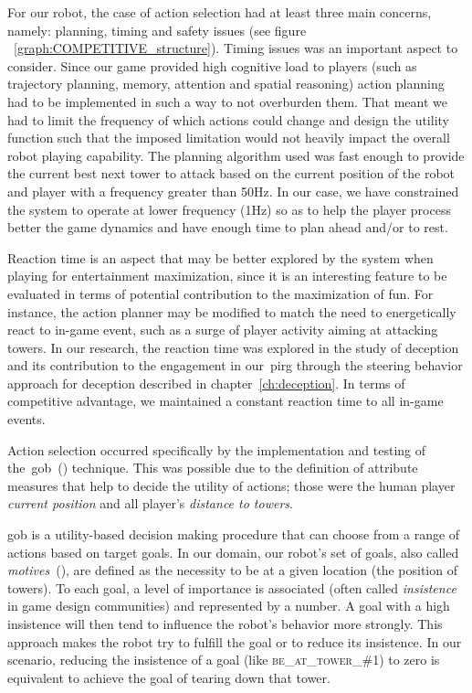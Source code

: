 For our robot, the case of action selection had at least three main concerns, namely: planning, timing and safety issues (see figure ~\ref{graph:COMPETITIVE_structure}). Timing issues was an important aspect to consider. Since our game provided high cognitive load to players (such as trajectory planning, memory, attention and spatial reasoning) action planning had to be implemented in such a way to not overburden them. That meant we had to limit the frequency of which actions could change and design the utility function such that the imposed limitation would not heavily impact the overall robot playing capability. The planning algorithm used was fast enough to provide the current best next tower to attack based on the current position of the robot and player with a frequency greater than 50Hz. In our case, we have constrained the system to operate at lower frequency (1Hz) so as to help the player process better the game dynamics and have enough time to plan ahead and/or to rest. 



Reaction time is an aspect that may be better explored by the system when playing for entertainment maximization, since it is an interesting feature to be evaluated in terms of potential contribution to the maximization of fun. For instance, the action planner may be modified to match the need to energetically react to in-game event, such as a surge of player activity aiming at attacking towers. In our research, the reaction time was explored in the study of deception and its contribution to the engagement in our~\gls{pirg} through the steering behavior approach for deception described in chapter~\ref{ch:deception}. In terms of competitive advantage, we maintained a constant reaction time to all in-game events.

Action selection occurred specifically by the implementation and testing of the~\gls{gob}~(\cite{millington_artificial_2009}) technique. This was possible due to the definition of attribute measures that help to decide the utility of actions; those were the human player \textit{current position} and all player's \textit{distance to towers}.

\glsdesc{gob} is a utility-based decision making procedure that can choose from a range of actions based on target goals. In our domain, our robot's set of goals, also called \textit{motives}~(\cite{millington_artificial_2009}), are defined as the necessity to be at a given location (the position of towers). To each goal, a level of importance is associated (often called \textit{insistence} in game design communities) and represented by a number. A goal with a high insistence will then tend to influence the robot's behavior more strongly. This approach makes the robot try to fulfill the goal or to reduce its insistence. In our scenario, reducing the insistence of a goal (like \textsc{be\_at\_tower\_\#1}) to zero is equivalent to achieve the goal of tearing down that tower. 

